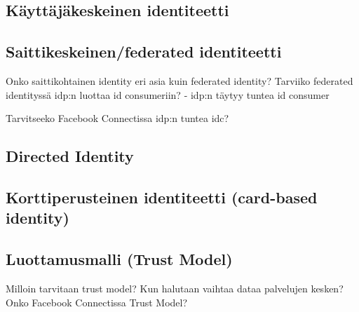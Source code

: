 \documentclass[english,gradu]{tktltiki}
\begin{document}
  \subsection{Käyttäjäkeskeinen identiteetti} %
  \label{sub:käyttäjäkeskeinen_identiteetti}


  \subsection{Saittikeskeinen/federated identiteetti} %
  \label{sub:saittikeskeinen_identiteetti}
  Onko saittikohtainen identity eri asia kuin federated identity?
  Tarviiko federated identityssä idp:n luottaa id consumeriin?
  - idp:n täytyy tuntea id consumer

  Tarvitseeko Facebook Connectissa idp:n tuntea idc?



  \subsection{Directed Identity} %
  \label{sub:directed_identity}


  \subsection{Korttiperusteinen identiteetti (card-based identity)} %
  \label{sub:korttiperusteinen_identiteetti_card_based_identity_}

  \subsection{Luottamusmalli (Trust Model)} %
  \label{sub:luottamusmalli_trust_model_}
  Milloin tarvitaan trust model? Kun halutaan vaihtaa dataa palvelujen kesken? Onko Facebook Connectissa Trust Model?
\end{document}

